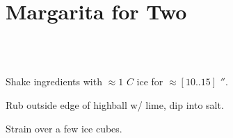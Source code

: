 \section[Margarita for Two]{Margarita for Two}


\begin{recipestats}[
	servings=2,
	preptime=5 \minute,
	source=Mike \& Jane,
	original=\citefield{joyofcooking2006}{title}~\cite{joyofcooking2006},
]
\end{recipestats}


\begin{ingredientcolumns}[1]
	\begin{ingredientblock}
		\\
		\\
	\end{ingredientblock}
\end{ingredientcolumns}


\begin{preparation}
\item Shake ingredients with $\approx1$ $C$ ice for $\approx [10 .. 15]$ $\second$.
\item Rub outside edge of highball w/ lime, dip into salt.
\item Strain over a few ice cubes.
\end{preparation}


\recipeend%
